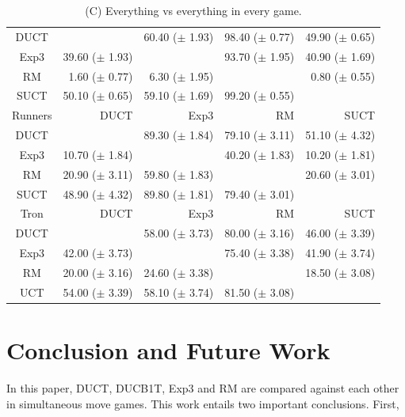 \documentclass[conference]{IEEEtran}
\begin{document}
\begin{table}
\begin{center}
\begin{tabular}{|c|rrrr|}
\hline
           DUCT    &          & 60.40 ($\pm$ 1.93)   & 98.40 ($\pm$ 0.77)   & 49.90 ($\pm$ 0.65)   \\
           Exp3    & 39.60 ($\pm$ 1.93)   &          & 93.70 ($\pm$ 1.95)   & 40.90 ($\pm$ 1.69)   \\
             RM    & 1.60 ($\pm$ 0.77)   & 6.30 ($\pm$ 1.95)   &          & 0.80 ($\pm$ 0.55)   \\
           SUCT    & 50.10 ($\pm$ 0.65)   & 59.10 ($\pm$ 1.69)   & 99.20 ($\pm$ 0.55)   &          \\
\hline
\hline
        Runners   &       DUCT   &       Exp3   &         RM   &       SUCT   \\
\hline
           DUCT    &          & 89.30 ($\pm$ 1.84)   & 79.10 ($\pm$ 3.11)   & 51.10 ($\pm$ 4.32)   \\
           Exp3    & 10.70 ($\pm$ 1.84)   &          & 40.20 ($\pm$ 1.83)   & 10.20 ($\pm$ 1.81)   \\
             RM    & 20.90 ($\pm$ 3.11)   & 59.80 ($\pm$ 1.83)   &          & 20.60 ($\pm$ 3.01)   \\
           SUCT    & 48.90 ($\pm$ 4.32)   & 89.80 ($\pm$ 1.81)   & 79.40 ($\pm$ 3.01)   &          \\
\hline
\hline
           Tron   &       DUCT   &       Exp3   &         RM   &       SUCT   \\
\hline
           DUCT    &          & 58.00 ($\pm$ 3.73)   & 80.00 ($\pm$ 3.16)   & 46.00 ($\pm$ 3.39)   \\
           Exp3    & 42.00 ($\pm$ 3.73)   &          & 75.40 ($\pm$ 3.38)   & 41.90 ($\pm$ 3.74)   \\
             RM    & 20.00 ($\pm$ 3.16)   & 24.60 ($\pm$ 3.38)   &          & 18.50 ($\pm$ 3.08)   \\
           UCT    & 54.00 ($\pm$ 3.39)   & 58.10 ($\pm$ 3.74)   & 81.50 ($\pm$ 3.08)   &          \\
\hline
\end{tabular}
\end{center}
\caption{(C) Everything vs everything in every game.}
\end{table}


\section{Conclusion and Future Work}
In this paper, DUCT, DUCB1T, Exp3 and RM are compared against each other in simultaneous move games. This work entails two important conclusions. First, 
\label{sec:conc}
\end{document}
